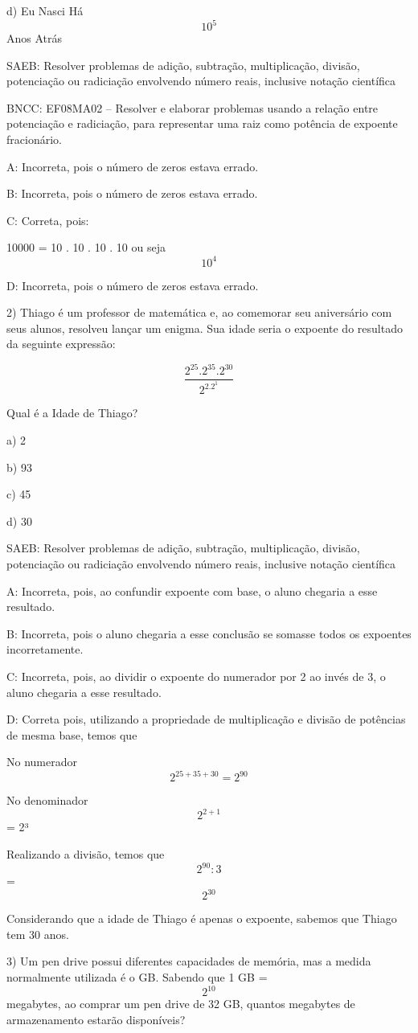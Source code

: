 d) Eu Nasci Há \[10^5\] Anos Atrás

SAEB: Resolver problemas de adição, subtração, multiplicação, divisão,
potenciação ou radiciação envolvendo número reais, inclusive notação
científica

BNCC: EF08MA02 -- Resolver e elaborar problemas usando a relação entre
potenciação e radiciação, para representar uma raiz como potência de
expoente fracionário.

A: Incorreta, pois o número de zeros estava errado.

B: Incorreta, pois o número de zeros estava errado.

C: Correta, pois:

10000 = 10 . 10 . 10 . 10 ou seja \[10^4\]

D: Incorreta, pois o número de zeros estava errado.

2) Thiago é um professor de matemática e, ao comemorar seu aniversário
com seus alunos, resolveu lançar um enigma. Sua idade seria o expoente
do resultado da seguinte expressão:

\[\frac {2^{25}. 2^{35}. 2^{30}} {2^2.2^1}\]

Qual é a Idade de Thiago?

a) 2

b) 93

c) 45

d) 30

SAEB: Resolver problemas de adição, subtração, multiplicação, divisão,
potenciação ou radiciação envolvendo número reais, inclusive notação
científica

A: Incorreta, pois, ao confundir expoente com base, o aluno chegaria a
esse resultado.

B: Incorreta, pois o aluno chegaria a esse conclusão se somasse todos os
expoentes incorretamente.

C: Incorreta, pois, ao dividir o expoente do numerador por 2 ao invés de
3, o aluno chegaria a esse resultado.

D: Correta pois, utilizando a propriedade de multiplicação e divisão de
potências de mesma base, temos que

No numerador \[2^{25+35+30}=2^{90}\]

No denominador \[2^{2+1}\] = 2³

Realizando a divisão, temos que \[2^{90}:3\] = \[2^{30}\]

Considerando que a idade de Thiago é apenas o expoente, sabemos que
Thiago tem 30 anos.

3) Um pen drive possui diferentes capacidades de memória, mas a medida
normalmente utilizada é o GB. Sabendo que 1 GB = \[2^{10}\] megabytes,
ao comprar um pen drive de 32 GB, quantos megabytes de armazenamento
estarão disponíveis?

